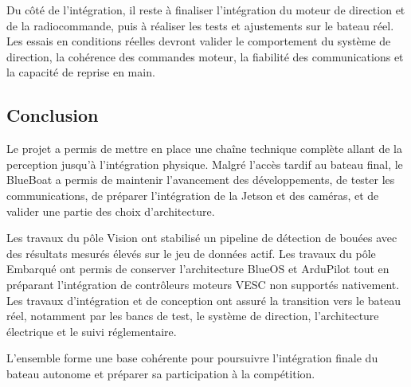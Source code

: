 \documentclass[11pt,letterpaper]{article}
\begin{document}
Du côté de l'intégration, il reste à finaliser l'intégration du moteur de direction et de la radiocommande, puis à réaliser les tests et ajustements sur le bateau réel. Les essais en conditions réelles devront valider le comportement du système de direction, la cohérence des commandes moteur, la fiabilité des communications et la capacité de reprise en main.

\subsection{Conclusion}

Le projet a permis de mettre en place une chaîne technique complète allant de la perception jusqu'à l'intégration physique. Malgré l'accès tardif au bateau final, le BlueBoat a permis de maintenir l'avancement des développements, de tester les communications, de préparer l'intégration de la Jetson et des caméras, et de valider une partie des choix d'architecture.

Les travaux du pôle Vision ont stabilisé un pipeline de détection de bouées avec des résultats mesurés élevés sur le jeu de données actif. Les travaux du pôle Embarqué ont permis de conserver l'architecture BlueOS et ArduPilot tout en préparant l'intégration de contrôleurs moteurs VESC non supportés nativement. Les travaux d'intégration et de conception ont assuré la transition vers le bateau réel, notamment par les bancs de test, le système de direction, l'architecture électrique et le suivi réglementaire.

L'ensemble forme une base cohérente pour poursuivre l'intégration finale du bateau autonome et préparer sa participation à la compétition.
\end{document}
